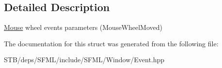 \subsection{Detailed Description}
\hyperlink{classsf_1_1_mouse}{Mouse} wheel events parameters (Mouse\+Wheel\+Moved) 

The documentation for this struct was generated from the following file\+:\begin{DoxyCompactItemize}
\item 
S\+T\+B/deps/\+S\+F\+M\+L/include/\+S\+F\+M\+L/\+Window/Event.\+hpp\end{DoxyCompactItemize}
